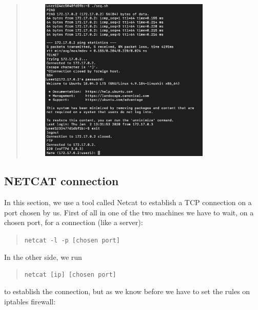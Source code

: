 \documentclass[11pt]{article}
\begin{document}
\begin{quote}
 \begin{figure}[!ht]
 \centering
 \includegraphics[width=0.8\textwidth]{pic7-hw8-1635747.png}
 \label{fig:conf}
 \end{figure}

\end{quote}

\subsection{NETCAT connection}
In this section, we use a tool called Netcat to establish a TCP connection on a port chosen by us. First of all in one of the two machines we have to wait, on a chosen port, for a connection (like a server):

\begin{quote}
 \texttt{netcat -l -p [chosen port]}
\end{quote}

In the other side, we run

\begin{quote}
 \texttt{netcat [ip] [chosen port]}
\end{quote}

to establish the connection, but as we know before we have to set the rules on iptables firewall:
\end{document}
